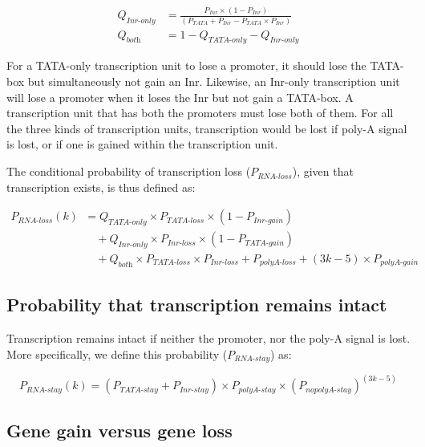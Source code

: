\documentclass[12pt,a4paper]{article}
\begin{document}
\begin{align*}
Q_\textit{Inr-only} & = \frac{P_\textit{Inr}\times(1 - P_\textit{Inr})}{(P_\textit{TATA} + P_\textit{Inr} - P_\textit{TATA}\times P_\textit{Inr})} \\[1ex]
Q_\textit{both} & = 1 - Q_\textit{TATA-only} -Q_\textit{Inr-only}
\end{align*}

For a TATA-only transcription unit to lose a promoter, it should lose the TATA-box but simultaneously not gain an Inr. Likewise, an Inr-only transcription unit will lose a promoter when it loses the Inr but not gain a TATA-box. A transcription unit that has both the promoters must lose both of them. For all the three kinds of transcription units, transcription would be lost if poly-A signal is lost, or if one is gained within the transcription unit.

The conditional probability of transcription loss ($P_\textit{RNA-loss}$), given that transcription exists, is thus defined as:

\begin{align}
P_\textit{RNA-loss}(k) & = Q_\textit{TATA-only} \times P_\textit{TATA-loss}\times(1-P_\textit{Inr-gain}) \nonumber\\[1pt]
 & \quad + Q_\textit{Inr-only}\times P_\textit{Inr-loss}\times(1-P_\textit{TATA-gain}) \nonumber \\[1pt]
 & \quad + Q_\textit{both}\times P_\textit{TATA-loss} \times P_\textit{Inr-loss} + P_\textit{polyA-loss} + (3k-5)\times P_\textit{polyA-gain}
\label{eqrnaloss}
\end{align}

\subsection{Probability that transcription remains intact}

Transcription remains intact if neither the promoter, nor the poly-A signal is lost. More specifically, we define this probability ($P_\textit{RNA-stay}$) as:

\begin{equation}
P_\textit{RNA-stay}(k) = (P_\textit{TATA-stay} + P_\textit{Inr-stay}) \times P_\textit{polyA-stay} \times (P_\textit{nopolyA-stay})^{(3k-5)}
\label{eqrnastay}
\end{equation}

\subsection{Gene gain versus gene loss}
\end{document}
